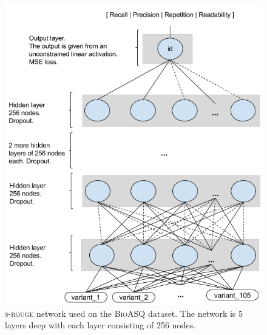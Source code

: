 \documentclass[11pt,a4paper]{article}
\newcommand{\bioasq}{\textsc{BioASQ}\xspace}
\begin{document}
\begin{figure}[ht]
{
\centering
\includegraphics[scale=0.35]{../../my_diagrams/BioASQ_networks/BioASQ-s-rouge.png}
\caption{\textsc{s-rouge} network used on the \bioasq dataset. The network is 5 layers deep with each layer consisting of 256 nodes.}
\label{fig:bioasq-s-rouge}
}
\end{figure}
\end{document}
